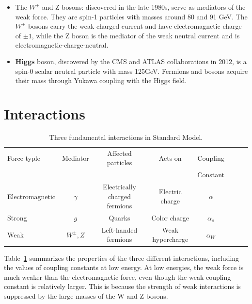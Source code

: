 \begin{itemize}
\begin{itemize}
  \item The $W^{\pm}$ and Z bosons: discovered in the late 1980s, serve as mediators of the weak force. They are spin-1 particles with masses around 80 and 91 GeV. The \textbf{$W^{\pm}$} bosons carry the weak charged current and have electromagnetic charge of $\pm 1$, while the Z boson is the mediator of the weak neutral current and is electromagnetic-charge-neutral. 
    \item \textbf{Higgs} boson, discovered by the CMS and ATLAS collaborations in 2012\cite{Aad:2012tfa}\cite{Chatrchyan:2012xdj}, is a spin-0 scalar neutral particle with mass 125GeV. Fermions and bosons acquire their mass through Yukawa coupling with the Higgs field. 
\end{itemize}
\end{itemize}
 
 

\section{Interactions}
\begin{table}[tbh]
\centering
\tiny
\begin{tabular}{|l|c|c|c|c|c|c|c}

\hline
    Force typle & Mediator & Affected particles & Acts on & Coupling\\
    &&&&Constant\\ 
    \hline
\hline
    Electromagnetic & $\gamma$&Electrically charged fermions&Electric charge& $\alpha$ \\
    Strong  & $g$ &Quarks & Color charge& $\alpha_s$ \\
    Weak & $W^{\pm}, Z$ &Left-handed fermions & Weak hypercharge& $\alpha_W$ \\
\hline
\end{tabular}
\caption{Three fundamental interactions in Standard Model. }
\label{tab:forces}
\end{table}

\par Table~\ref{tab:forces} summarizes the properties of the three different interactions, including the values of coupling constants at low energy. 
At low energies, the weak force is much weaker than the electromagnetic force, even though the weak coupling constant is relatively larger. 
This is because the strength of weak interactions is suppressed by the large masses of the W and Z bosons. 

